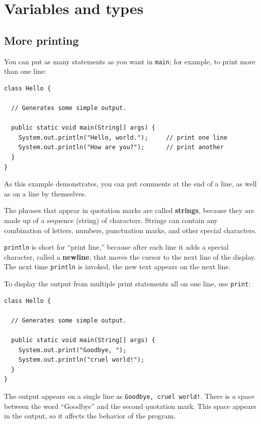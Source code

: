 \chapter{Variables and types}
\label{chap02}

\section{More printing}

You can put as many
statements as you want in {\tt main}; for example, to
print more than one line:

\begin{lstlisting}
class Hello {

  // Generates some simple output.

  public static void main(String[] args) {
    System.out.println("Hello, world.");     // print one line
    System.out.println("How are you?");      // print another
  }
}
\end{lstlisting}
%
As this example demonstrates, you can put comments at the
end of a line, as well as on a line by themselves.


The phrases that appear in quotation marks are called {\bf strings},
because they are made up of a sequence (string) of characters.
Strings can contain any combination of letters, numbers, punctuation
marks, and other special characters.


{\tt println} is short for ``print line,'' because after each
line it adds a special character, called a {\bf newline}, that
moves the cursor to the next line of the display.
The next time {\tt println} is invoked, the new text appears
on the next line.

To display the output from multiple print
statements all on one line, use {\tt print}:

\begin{lstlisting}
class Hello {

  // Generates some simple output.

  public static void main(String[] args) {
    System.out.print("Goodbye, ");
    System.out.println("cruel world!");
  }
}
\end{lstlisting}
%
The output appears on a single line as
{\tt Goodbye, cruel world!}.  There is a space
between the word ``Goodbye'' and the second quotation mark.
This space appears in the output, so it affects the behavior
of the program.

